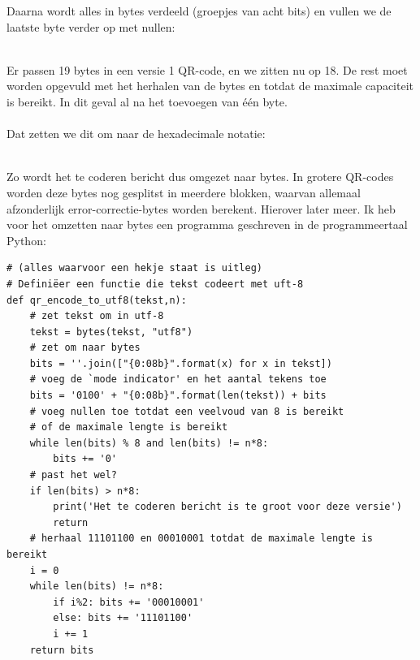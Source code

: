 \documentclass[a4paper]{article}
\begin{document}
Daarna wordt alles in bytes verdeeld (groepjes van acht bits) en vullen we de laatste byte verder op met nullen:\\\\

Er passen 19 bytes in een versie 1 QR-code, en we zitten nu op 18. De rest moet worden opgevuld met het herhalen van de bytes  en   totdat de maximale capaciteit is bereikt. In dit geval al na het toevoegen van één byte.\\\\
Dat zetten we dit om naar de hexadecimale notatie:\\\\

Zo wordt het te coderen bericht dus omgezet naar bytes. In grotere QR-codes worden deze bytes nog gesplitst in meerdere blokken, waarvan allemaal afzonderlijk error-correctie-bytes worden berekent. Hierover later meer.
Ik heb voor het omzetten naar bytes een programma geschreven in de programmeertaal Python:
\begin{verbatim}
# (alles waarvoor een hekje staat is uitleg)
# Definiëer een functie die tekst codeert met uft-8
def qr_encode_to_utf8(tekst,n):
    # zet tekst om in utf-8
    tekst = bytes(tekst, "utf8")
    # zet om naar bytes
    bits = ''.join(["{0:08b}".format(x) for x in tekst])
    # voeg de `mode indicator' en het aantal tekens toe 
    bits = '0100' + "{0:08b}".format(len(tekst)) + bits
    # voeg nullen toe totdat een veelvoud van 8 is bereikt
    # of de maximale lengte is bereikt
    while len(bits) % 8 and len(bits) != n*8:
        bits += '0'
    # past het wel?
    if len(bits) > n*8:
        print('Het te coderen bericht is te groot voor deze versie')
        return
    # herhaal 11101100 en 00010001 totdat de maximale lengte is bereikt
    i = 0
    while len(bits) != n*8:
        if i%2: bits += '00010001'
        else: bits += '11101100'
        i += 1
    return bits
\end{verbatim}
\end{document}
